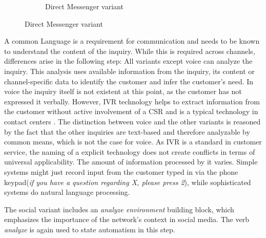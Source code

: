 \begin{figure}[caption={Route inquiry detail process}, label={fig:inbound:route}]
\begin{subfigure}[b]{.45\textwidth}
\begin{tikzpicture}
	 		\end{tikzpicture}
	 		\caption{Direct Messenger variant}\label{fig:inbound:route:dm}
	 	\end{subfigure}
	 \end{figure}
	 
	 A common Language is a requirement for communication and needs to be known to understand the content of the inquiry. While this is required across channels, differences arise in the following step: All variants except voice can analyze the inquiry. This analysis uses available information from the inquiry, \ie its content or channel-specific data to identify the customer and infer the customer's need. In voice the inquiry itself is not existent at this point, as the customer has not expressed it verbally. However, \acrfull{IVR} technology helps to extract information from the customer without active involvement of a \acrshort{CSR} and is a typical technology in contact centers \citep{Thomas:2009}. The distinction between voice and the other variants is reasoned by the fact that the other inquiries are text-based and therefore analyzable by common means, which is not the case for voice. As \acrshort{IVR} is a standard in customer service, the naming of a explicit technology does not create conflicts in terms of universal applicability. The amount of information processed by it varies. Simple systems might just record input from the customer typed in via the phone keypad(\textit{if you have  a question regarding X, please press 2}), while sophisticated systems do natural language processing.
	 
	 The social variant includes an \textit{analyze environment} building block, which emphasizes the importance of the network's context in social media. The verb \textit{analyze} is again used to state automatism in this step. 
	 
